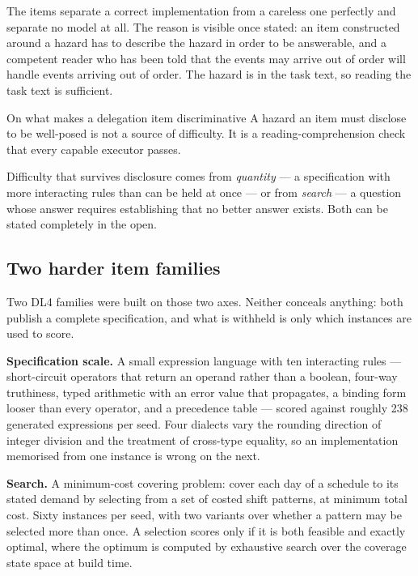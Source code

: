 The items separate a correct implementation from a careless one perfectly and separate no model at all. The reason is visible once stated: an item constructed around a hazard has to describe the hazard in order to be answerable, and a competent reader who has been told that the events may arrive out of order will handle events arriving out of order. The hazard is in the task text, so reading the task text is sufficient.

\begin{claimbox}{On what makes a delegation item discriminative}
A hazard an item must disclose to be well-posed is not a source of difficulty. It is a reading-comprehension check that every capable executor passes.

Difficulty that survives disclosure comes from \emph{quantity} --- a specification with more interacting rules than can be held at once --- or from \emph{search} --- a question whose answer requires establishing that no better answer exists. Both can be stated completely in the open.
\end{claimbox}

\subsection{Two harder item families}\label{sec:t4}

Two DL4 families were built on those two axes. Neither conceals anything: both publish a complete specification, and what is withheld is only which instances are used to score.

\textbf{Specification scale.} A small expression language with ten interacting rules --- short-circuit operators that return an operand rather than a boolean, four-way truthiness, typed arithmetic with an error value that propagates, a binding form looser than every operator, and a precedence table --- scored against roughly 238 generated expressions per seed. Four dialects vary the rounding direction of integer division and the treatment of cross-type equality, so an implementation memorised from one instance is wrong on the next.

\textbf{Search.} A minimum-cost covering problem: cover each day of a schedule to its stated demand by selecting from a set of costed shift patterns, at minimum total cost. Sixty instances per seed, with two variants over whether a pattern may be selected more than once. A selection scores only if it is both feasible and exactly optimal, where the optimum is computed by exhaustive search over the coverage state space at build time.

